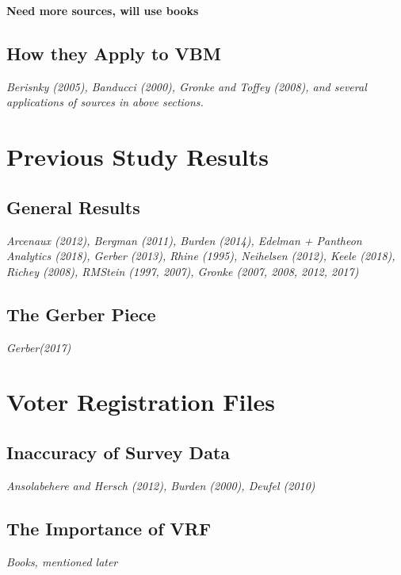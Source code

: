 \documentclass[12pt,twoside]{reedthesis}
\begin{document}
  \textbf{Need more sources, will use books}
  
  \subsection{How they Apply to VBM}\label{how-they-apply-to-vbm}
  
  \emph{Berisnky (2005), Banducci (2000), Gronke and Toffey (2008), and
  several applications of sources in above sections.}
  
  \section{Previous Study Results}\label{previous-study-results}
  
  \subsection{General Results}\label{general-results}
  
  \emph{Arcenaux (2012), Bergman (2011), Burden (2014), Edelman + Pantheon
  Analytics (2018), Gerber (2013), Rhine (1995), Neihelsen (2012), Keele
  (2018), Richey (2008), RMStein (1997, 2007), Gronke (2007, 2008, 2012,
  2017)}
  
  \subsection{The Gerber Piece}\label{the-gerber-piece}
  
  \emph{Gerber(2017)}
  
  \section{Voter Registration Files}\label{voter-registration-files}
  
  \subsection{Inaccuracy of Survey Data}\label{inaccuracy-of-survey-data}
  
  \emph{Ansolabehere and Hersch (2012), Burden (2000), Deufel (2010)}
  
  \subsection{The Importance of VRF}\label{the-importance-of-vrf}
  
  \emph{Books, mentioned later}
  
\end{document}
